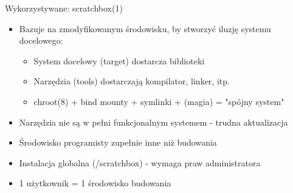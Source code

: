 \documentclass[presentation,aspectratio=43,12pt]{beamer}
\begin{document}
\begin{frame}[label=sec-3-2]{Wykorzystywane: scratchbox(1)}
\begin{itemize}
\item Bazuje na zmodyfikowanym środowisku, by stworzyć iluzję systemu
docelowego:

\begin{itemize}
\item System docelowy (target) dostarcza biblioteki
\item Narzędzia (tools) dostarczają kompilator, linker, itp.
\item chroot(8) + bind mounty + symlinki + (magia) = "spójny system"
\end{itemize}
\end{itemize}

\pause

\begin{itemize}
\item Narzędzia nie są w pełni funkcjonalnym systemem - trudna
aktualizacja

\item Środowisko programisty zupełnie inne niż budowania

\item Instalacja globalna (/scratchbox) - wymaga praw administratora

\item 1 użytkownik = 1 środowisko budowania
\end{itemize}


\end{frame}
\end{document}
